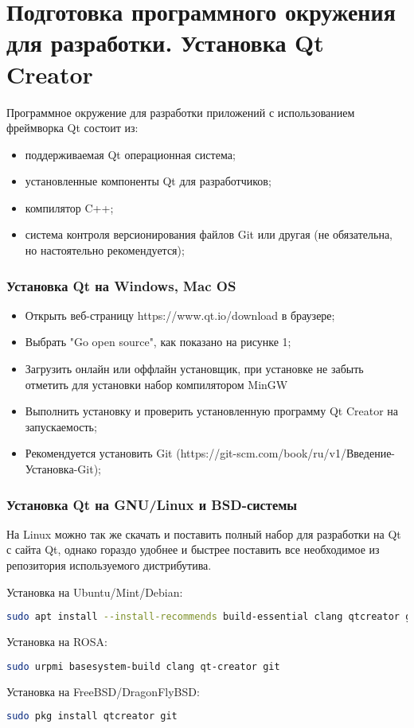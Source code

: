 \section{Подготовка программного окружения для разработки. Установка Qt Creator}

Программное окружение для разработки приложений с использованием фреймворка Qt состоит из:
\begin{itemize}
  \item поддерживаемая Qt операционная система;
  \item установленные компоненты Qt для разработчиков;
  \item компилятор C++;
  \item система контроля версионирования файлов Git или другая (не обязательна, но настоятельно рекомендуется);
\end{itemize}

\subsubsection{Установка Qt на Windows, Mac OS}
\begin{itemize}
  \item Открыть веб-страницу https://www.qt.io/download в браузере;
  \item Выбрать "Go open source", как показано на рисунке 1;
  \item Загрузить онлайн или оффлайн установщик, при установке не забыть отметить для установки набор компилятором MinGW
  \item Выполнить установку и проверить установленную программу Qt Creator на запускаемость;
  \item Рекомендуется установить Git (https://git-scm.com/book/ru/v1/Введение-Установка-Git);
\end{itemize}

\subsubsection{Установка Qt на GNU/Linux и BSD-системы}
На Linux можно так же скачать и поставить полный набор для разработки на Qt с сайта Qt, однако гораздо удобнее и быстрее поставить все необходимое из репозитория используемого дистрибутива.

Установка на Ubuntu/Mint/Debian:
\begin{lstlisting}[language=bash]
sudo apt install --install-recommends build-essential clang qtcreator git
\end{lstlisting}

Установка на ROSA:
\begin{lstlisting}[language=bash]
sudo urpmi basesystem-build clang qt-creator git
\end{lstlisting}

Установка на FreeBSD/DragonFlyBSD:
\begin{lstlisting}[language=bash]
sudo pkg install qtcreator git
\end{lstlisting}

\clearpage
